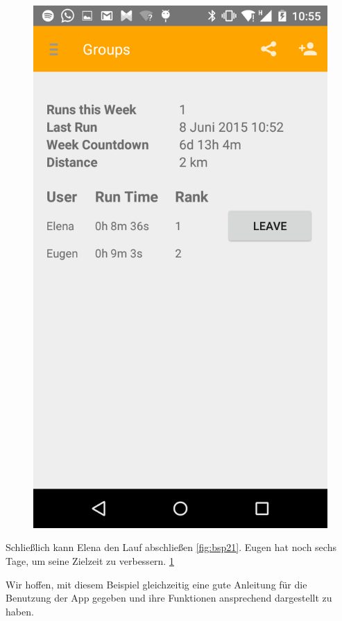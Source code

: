 \begin{figure}
\begin{minipage}{.4\textwidth}
  \includegraphics[width=.8\linewidth]{abb/bsp/bsp22}
  \label{fig:bsp22}
\end{minipage}
\end{figure}

Schließlich kann Elena den Lauf abschließen \ref{fig:bsp21}. Eugen hat noch sechs Tage, um seine Zielzeit zu verbessern. \ref{fig:bsp22}

Wir hoffen, mit diesem Beispiel gleichzeitig eine gute Anleitung für die Benutzung der App gegeben und ihre Funktionen ansprechend dargestellt zu haben.